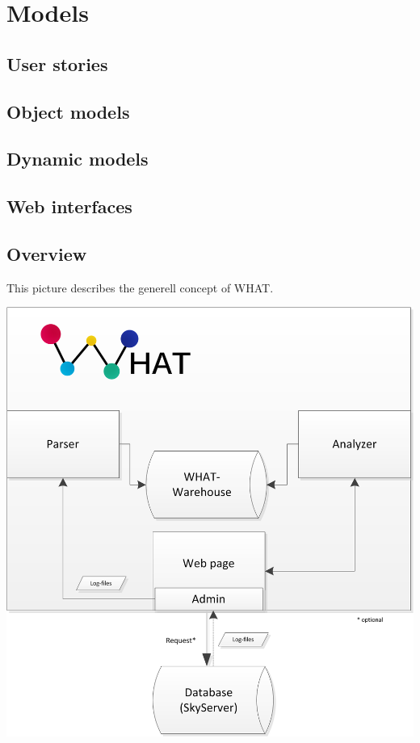 \section{Models}

\subsection{User stories}

\subsection{Object models}

\subsection{Dynamic models}

\subsection{Web interfaces}

\newpage
\subsection{Overview}\label{overview}
This picture describes the generell concept of WHAT.
\begin{center}
\includegraphics[width=1\linewidth]{Pictures/GenerellConcept.png}
\end{center} 

